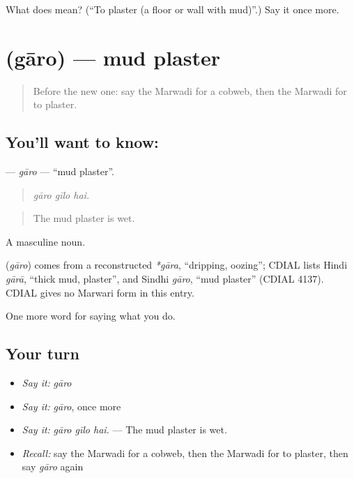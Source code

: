 \begin{tcolorbox}[breakable,colback=teal!4,colframe=teal!35!black,title={Before you move on}]
What does  mean? (\textquotedblleft{}To plaster (a floor or wall with mud)\textquotedblright{}.) Say it once more.
\end{tcolorbox}
\section[\texorpdfstring{\mw{गारो} (gāro)}{गारो (gāro)}]{ (gāro) — mud plaster}

\label{lesson:MW-C172-garo}



\begin{quote}
Before the new one: say the Marwadi for a cobweb, then the Marwadi for to plaster.
\end{quote}

\subsection*{You'll want to know: }
\textbf{} — \emph{gāro} — \textquotedblleft{}mud plaster\textquotedblright{}.

\begin{quote}
  
\end{quote}

\begin{quote}
\emph{gāro gīlo hai.}
\end{quote}

\begin{quote}
The mud plaster is wet.
\end{quote}

A masculine noun.

\begin{cousinweb}
\textbf{} (\emph{gāro}) comes from a reconstructed \emph{*gāra}, \textquotedblleft{}dripping, oozing\textquotedblright{}; CDIAL lists Hindi \emph{gārā}, \textquotedblleft{}thick mud, plaster\textquotedblright{}, and Sindhi \emph{gāro}, \textquotedblleft{}mud plaster\textquotedblright{} (CDIAL 4137). CDIAL gives no Marwari form in this entry.
\end{cousinweb}

\begin{grammarlens}[title={What you've built}]
One more word for saying what you do.
\end{grammarlens}

\subsection*{Your turn}
\begin{itemize}
\raggedright
  \item \emph{Say it:} \emph{gāro}
  \item \emph{Say it:} \emph{gāro}, once more
  \item \emph{Say it:} \emph{gāro gīlo hai.} — The mud plaster is wet.
  \item \emph{Recall:} say the Marwadi for a cobweb, then the Marwadi for to plaster, then say \emph{gāro} again
\end{itemize}

